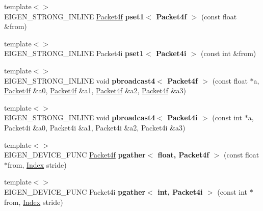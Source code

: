 \begin{DoxyCompactItemize}
{\footnotesize template$<$$>$ }\\E\+I\+G\+E\+N\+\_\+\+S\+T\+R\+O\+N\+G\+\_\+\+I\+N\+L\+I\+NE \hyperlink{struct_eigen_1_1internal_1_1_packet4f}{Packet4f} {\bfseries pset1$<$ Packet4f $>$} (const float \&from)
\item 
\mbox{\label{namespace_eigen_1_1internal_a2531efc4e18dcd18aa6c28ea26b5fd4c}} 
{\footnotesize template$<$$>$ }\\E\+I\+G\+E\+N\+\_\+\+S\+T\+R\+O\+N\+G\+\_\+\+I\+N\+L\+I\+NE Packet4i {\bfseries pset1$<$ Packet4i $>$} (const int \&from)
\item 
\mbox{\label{namespace_eigen_1_1internal_adb4795938f0301e168c416c4b53ea7ea}} 
{\footnotesize template$<$$>$ }\\E\+I\+G\+E\+N\+\_\+\+S\+T\+R\+O\+N\+G\+\_\+\+I\+N\+L\+I\+NE void {\bfseries pbroadcast4$<$ Packet4f $>$} (const float $\ast$a, \hyperlink{struct_eigen_1_1internal_1_1_packet4f}{Packet4f} \&a0, \hyperlink{struct_eigen_1_1internal_1_1_packet4f}{Packet4f} \&a1, \hyperlink{struct_eigen_1_1internal_1_1_packet4f}{Packet4f} \&a2, \hyperlink{struct_eigen_1_1internal_1_1_packet4f}{Packet4f} \&a3)
\item 
\mbox{\label{namespace_eigen_1_1internal_afd48b2326a98fc69541aebbc7b916e40}} 
{\footnotesize template$<$$>$ }\\E\+I\+G\+E\+N\+\_\+\+S\+T\+R\+O\+N\+G\+\_\+\+I\+N\+L\+I\+NE void {\bfseries pbroadcast4$<$ Packet4i $>$} (const int $\ast$a, Packet4i \&a0, Packet4i \&a1, Packet4i \&a2, Packet4i \&a3)
\item 
\mbox{\label{namespace_eigen_1_1internal_a5edf629e883e10447347e830b8c9f06f}} 
{\footnotesize template$<$$>$ }\\E\+I\+G\+E\+N\+\_\+\+D\+E\+V\+I\+C\+E\+\_\+\+F\+U\+NC \hyperlink{struct_eigen_1_1internal_1_1_packet4f}{Packet4f} {\bfseries pgather$<$ float, Packet4f $>$} (const float $\ast$from, \hyperlink{namespace_eigen_a62e77e0933482dafde8fe197d9a2cfde}{Index} stride)
\item 
\mbox{\label{namespace_eigen_1_1internal_ad1b61241ebacb0d1436b87089571eb33}} 
{\footnotesize template$<$$>$ }\\E\+I\+G\+E\+N\+\_\+\+D\+E\+V\+I\+C\+E\+\_\+\+F\+U\+NC Packet4i {\bfseries pgather$<$ int, Packet4i $>$} (const int $\ast$from, \hyperlink{namespace_eigen_a62e77e0933482dafde8fe197d9a2cfde}{Index} stride)

\end{DoxyCompactItemize}
